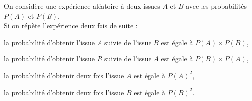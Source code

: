 \begin{bprop}
	On considère une expérience aléatoire à deux issues $A$ et $B$ avec les probabilités $P(A)$ et $P(B)$.\\
    Si on répète l'expérience deux fois de suite :\\
    \begin{itemDef}
        \item la probabilité d'obtenir l'issue $A$ suivie de l'issue $B$ est égale à $P(A) \times P(B)$,
        \item la probabilité d'obtenir l'issue $B$ suivie de l'issue $A$ est égale à $P(B) \times P(A)$,
        \item la probabilité d'obtenir deux fois l'issue $A$ est égale à $P(A)^2$,
        \item la probabilité d'obtenir deux fois l'issue $B$ est égale à $P(B)^2$.
    \end{itemDef}
\end{bprop}

